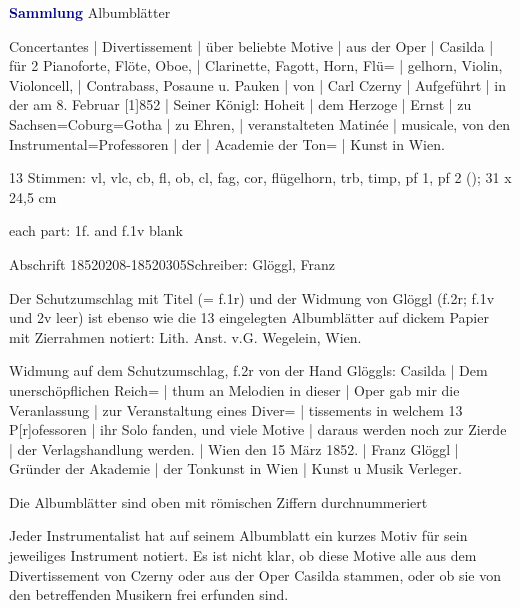 \documentclass[a4paper, twocolumn, 11pt]{book}
\begin{document}
\par \vspace{16pt} \textcolor{darkblue}{\textbf{Sammlung}} Albumblätter
\par \begin{itshape} Concertantes | Divertissement | über beliebte Motive | aus der Oper | Casilda | für 2 Pianoforte, Flöte, Oboe, | Clarinette, Fagott, Horn, Flü= | gelhorn, Violin, Violoncell, | Contrabass, Posaune u. Pauken | von | Carl Czerny | Aufgeführt | in der am 8. Februar [1]852 | Seiner Königl: Hoheit | dem Herzoge | Ernst | zu Sachsen=Coburg=Gotha | zu Ehren, | veranstalteten Matinée | musicale, von den Instrumental=Professoren | der | Academie der Ton= | Kunst in Wien.\end{itshape} 
\par \textcolor{darkblue}{}  13 Stimmen: vl, vlc, cb, fl, ob, cl, fag, cor, flügelhorn, trb, timp, pf 1, pf 2  (); 31 x 24,5 cm\newline \begin{small} each part: 1f. and f.1v blank\end{small} \newline Abschrift  18520208-18520305\newline Schreiber: Glöggl, Franz
\par Der Schutzumschlag mit Titel (= f.1r) und der Widmung von Glöggl (f.2r; f.1v und 2v leer) ist ebenso wie die 13 eingelegten Albumblätter auf dickem Papier mit Zierrahmen notiert: {\textquotedbl}Lith. Anst. v.G. Wegelein, Wien.{\textquotedbl}
\par Widmung auf dem Schutzumschlag, f.2r von der Hand Glöggls: Casilda | Dem unerschöpflichen Reich= | thum an Melodien in dieser | Oper gab mir die Veranlassung | zur Veranstaltung eines Diver= | tissements in welchem 13 P[r]ofessoren | ihr Solo fanden, und viele Motive | daraus werden noch zur Zierde | der Verlagshandlung werden. | Wien den 15 März 1852. | Franz Glöggl | Gründer der Akademie | der Tonkunst in Wien | Kunst u Musik Verleger.
\par Die Albumblätter sind oben mit römischen Ziffern durchnummeriert
\par Jeder Instrumentalist hat auf seinem Albumblatt ein kurzes Motiv für sein jeweiliges Instrument notiert. Es ist nicht klar, ob diese Motive alle aus dem {\textquotedbl}Divertissement{\textquotedbl} von Czerny oder aus der Oper {\textquotedbl}Casilda{\textquotedbl} stammen, oder ob sie von den betreffenden Musikern frei erfunden sind.
\end{document}
